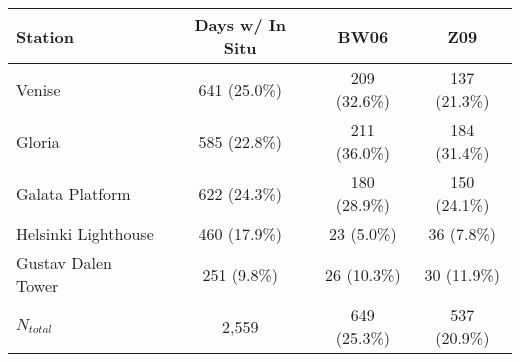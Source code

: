 \documentclass[preview]{standalone}
\begin{document}
\begin{table}
\begin{tabular}{lccc}\hline
Station 				& Days w/ In Situ 	& BW06	        & Z09          \\\hline
Venise 					& 641 (25.0\%) 	    & 209 (32.6\%)	& 137 (21.3\%) \\
Gloria 					& 585 (22.8\%)	    & 211 (36.0\%)	& 184 (31.4\%) \\
Galata Platform 		& 622 (24.3\%)	    & 180 (28.9\%)	& 150 (24.1\%) \\
Helsinki Lighthouse 	& 460 (17.9\%)	    & 23 (5.0\%)	& 36 (7.8\%)   \\
Gustav Dalen Tower 		& 251 (9.8\%)	    & 26 (10.3\%)	& 30 (11.9\%)  \\\hline
$N_{total}$ 			& 2,559             & 649 (25.3\%) 	& 537 (20.9\%) \\

\end{tabular}
\end{table}
\end{document}
